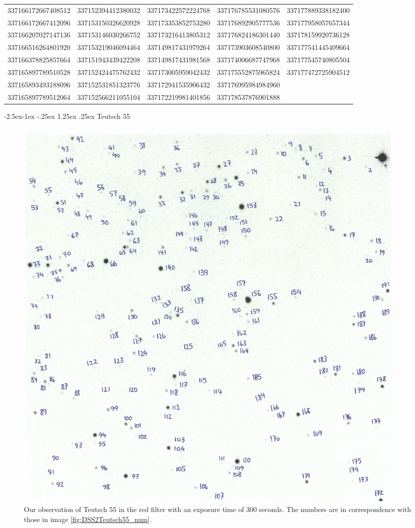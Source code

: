 \documentclass{article}
\makeatletter
\renewcommand\paragraph{\@startsection{paragraph}{4}{\z@}%
            {-2.5ex\@plus -1ex \@minus -.25ex}%
            {1.25ex \@plus .25ex}%
            {\normalfont\normalsize\bfseries}}
\makeatother
\begin{document}
\begin{table}[H]
\begin{tabular}{lllll}
337166172667408512 & 337152394412380032 & 337173422572224768 & 337176785531080576 & 337177889338182400 \\
337166172667412096 & 337153150326620928 & 337173353852753280 & 337176892905777536 & 337177958057657344 \\
337166207027147136 & 337153146030266752 & 337173216413805312 & 337176824186301440 & 337178159920736128 \\
337166516264801920 & 337153219046094464 & 337149817431979264 & 337173903608540800 & 337177541445409664 \\
337166378825857664 & 337151943439422208 & 337149817431981568 & 337174006687747968 & 337177545740805504 \\
337165897789510528 & 337152424475762432 & 337173005959042432 & 337175552875965824 & 337177472725904512 \\
337165893493188096 & 337152531851323776 & 337172941535906432 & 337176995984984960 &                    \\
337165897789512064 & 337152566211055104 & 337172219981401856 & 337178537876901888 &                   
\end{tabular}
\end{table}






\paragraph{Teutsch 55}

\begin{figure}[H]
  \centering
    \includegraphics[width=0.95\textwidth]{obsTeutsch55_num.jpg}
  \caption{Our observation of Teutsch 55 in the red filter with an exposure time of 300 seconds. The numbers are in correspondence with those in image \ref{fig:DSS2Teutsch55_num}.}
  \label{fig:obsTeutsch55_num}
\end{figure}
\end{document}

